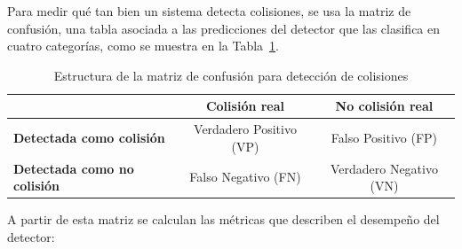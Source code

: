 Para medir qué tan bien un sistema detecta colisiones, se usa la matriz de confusión, una
tabla asociada a las predicciones del detector que las clasifica en cuatro categorías, como
se muestra en la Tabla~\ref{tab:confusion_matrix}.

\begin{table}[h!]
\centering
\caption{Estructura de la matriz de confusión para detección de colisiones}
\label{tab:confusion_matrix}
\begin{tabular}{|l|c|c|}
\hline
 & \textbf{Colisión real} & \textbf{No colisión real} \\
\hline
\textbf{Detectada como colisión} & Verdadero Positivo (VP) & Falso Positivo (FP) \\
\textbf{Detectada como no colisión} & Falso Negativo (FN) & Verdadero Negativo (VN) \\
\hline
\end{tabular}
\end{table}

A partir de esta matriz se calculan las métricas que describen el desempeño del detector:

